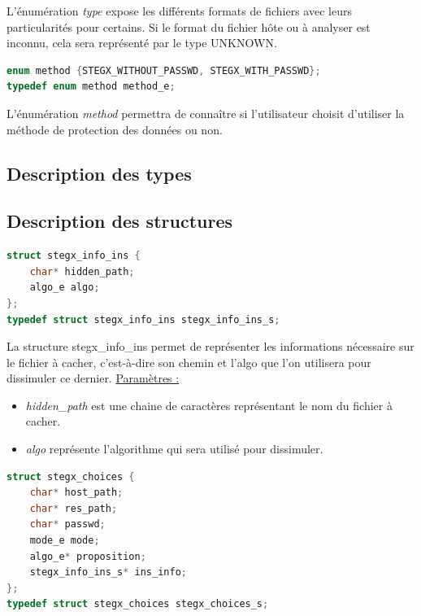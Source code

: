 \documentclass[11pt]{article}
\begin{document}
L'énumération \textit{type} expose les différents formats de fichiers avec leurs 
particularités pour certains. Si le format du fichier hôte ou à analyser 
est inconnu, cela sera représenté par le type UNKNOWN. \newline


\begin{lstlisting}[language=c]
enum method {STEGX_WITHOUT_PASSWD, STEGX_WITH_PASSWD};
typedef enum method method_e;
\end{lstlisting}

L'énumération \textit{method} permettra de connaître si l'utilisateur choisit
d'utiliser la méthode de protection des données ou non. \newline

\subsection{Description des types}

\subsection{Description des structures}

\begin{lstlisting}[language=c]
struct stegx_info_ins {
    char* hidden_path;
    algo_e algo;
};
typedef struct stegx_info_ins stegx_info_ins_s;
\end{lstlisting}

La structure stegx\_info\_ins permet de représenter les informations 
nécessaire sur le fichier à cacher, c'est-à-dire son chemin et l'algo que 
l'on utilisera pour dissimuler ce dernier. \newline
\underline{Paramètres :}
\begin{itemize}
\item \textit{hidden\_path} est une chaine de caractères représentant le nom du fichier 
à cacher. 
\item \textit{algo} représente l'algorithme qui sera utilisé pour dissimuler. 
\newline
\end{itemize}

\begin{lstlisting}[language=c]
struct stegx_choices {
    char* host_path;
    char* res_path;                         
    char* passwd;                           
    mode_e mode;   
    algo_e* proposition;                         
    stegx_info_ins_s* ins_info;             
};
typedef struct stegx_choices stegx_choices_s;
\end{lstlisting}
\end{document}
